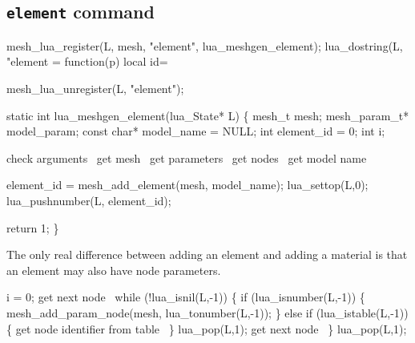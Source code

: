 \subsection{{\tt{}element} command}

\nwenddocs{}\plusendmoddef
mesh_lua_register(L, mesh, "element", lua_meshgen_element);
lua_dostring(L, 
"element = function(p) local id=%
\nwendcode{}\nwdocspar

\nwenddocs{}\plusendmoddef
mesh_lua_unregister(L, "element");
\nwendcode{}\nwdocspar

\nwenddocs{}\plusendmoddef
static int lua_meshgen_element(lua_State* L)
\{
    mesh_t mesh;
    mesh_param_t* model_param;
    const char* model_name = NULL;
    int element_id = 0;
    int i;

    \LA{}check arguments~{\nwtagstyle{}}\RA{}
    \LA{}get \code{}mesh\edoc{}~{\nwtagstyle{}}\RA{}
    \LA{}get parameters~{\nwtagstyle{}}\RA{}
    \LA{}get nodes~{\nwtagstyle{}}\RA{}
    \LA{}get model name~{\nwtagstyle{}}\RA{}

    element_id = mesh_add_element(mesh, model_name);
    lua_settop(L,0);
    lua_pushnumber(L, element_id);

    return 1;
\}

\nwendcode{}\nwdocspar

The only real difference between adding an element and adding a
material is that an element may also have node parameters.

\nwenddocs{}\endmoddef
i = 0;
\LA{}get next node~{\nwtagstyle{}}\RA{}
while (!lua_isnil(L,-1)) \{
    if (lua_isnumber(L,-1)) \{
        mesh_add_param_node(mesh, lua_tonumber(L,-1));
    \} else if (lua_istable(L,-1)) \{
        \LA{}get node identifier from table~{\nwtagstyle{}}\RA{}
    \}
    lua_pop(L,1);
    \LA{}get next node~{\nwtagstyle{}}\RA{}
\}
lua_pop(L,1);

